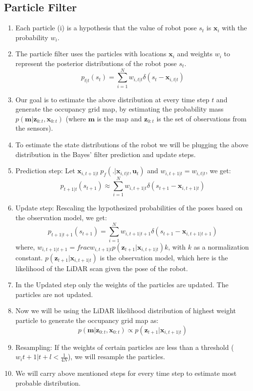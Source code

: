 \documentclass[a4paper]{article}
\begin{document}
\subsection{Particle Filter}
\begin{enumerate}
    \item Each particle (i) is a hypothesis that the value of robot pose $s_t$ is $\mathbf{x}_{i}$ with the probability $w_{i}$.
    \item The particle filter uses the particles with locations $\mathbf{x}_{i}$ and weights $w_{i}$ to represent the posterior distributions of the robot pose $s_t$.
    \begin{equation}
        p_{t|t}(s_t) = \sum_{i=1}^{N} w_{i,t|t} \delta(s_t - \mathbf{x}_{i,t|t})
    \end{equation}
    \item Our goal is to estimate the above distribution at every time step $t$ and generate the occupancy grid map, by estimating the probability mass $p(\mathbf{m}| \mathbf{z}_{0:t}, \mathbf{x}_{0:t})$ (where $\mathbf{m}$ is the map and $\mathbf{z}_{0:t}$ is the set of observations from the sensors).
    \item To estimate the state distributions of the robot we will be plugging the above distribution in the Bayes' filter prediction and update steps.
    \item Prediction step: Let $\mathbf{x}_{i,t+1|t} ~ p_f(.|\mathbf{x}_{i,t|t}, \mathbf{u}_{t})$ and $w_{i,t+1|t} = w_{i,t|t}$, we get:
    \begin{equation}
        p_{t+1|t}(s_{t+1}) \approx \sum_{i=1}^{N} w_{i,t+1|t} \delta(s_{t+1} - \mathbf{x}_{i,t+1|t})
    \end{equation}
    \item Update step: Rescaling the hypothesized probabilities of the poses based on the observation model, we get:
    \begin{equation}
        p_{t+1|t+1}(s_{t+1}) = \sum_{i=1}^{N} w_{i,t+1|t+1} \delta(s_{t+1} - \mathbf{x}_{i,t+1|t+1})
    \end{equation}
    where, $w_{i,t+1|t+1} = frac{w_{i,t+1|t} p(\mathbf{z}_{t+1}|\mathbf{x}_{i,t+1|t})}{k}$, with $k$ as a normalization constant.  $p(\mathbf{z}_{t+1}|\mathbf{x}_{i,t+1|t})$ is the observation model, which here is the likelihood of the LiDAR scan given the pose of the robot.
    \item In the Updated step only the weights of the particles are updated. The particles are not updated.
    \item Now we will be using the LiDAR likelihood distribution of highest weight particle to generate the occupancy grid map as:
    \begin{equation}
        p(\mathbf{m}| \mathbf{z}_{0:t}, \mathbf{x}_{0:t}) \propto p(\mathbf{z}_{t+1}|\mathbf{x}_{i,t+1|t})
    \end{equation}
    \item Resampling: If the weights of certain particles are less than a threshold ($w_i{t+1|t+l} < \frac{1}{4N}$), we will resample the particles.
    \item We will carry above mentioned steps for every time step to estimate most probable distribution.
\end{enumerate}
\end{document}
